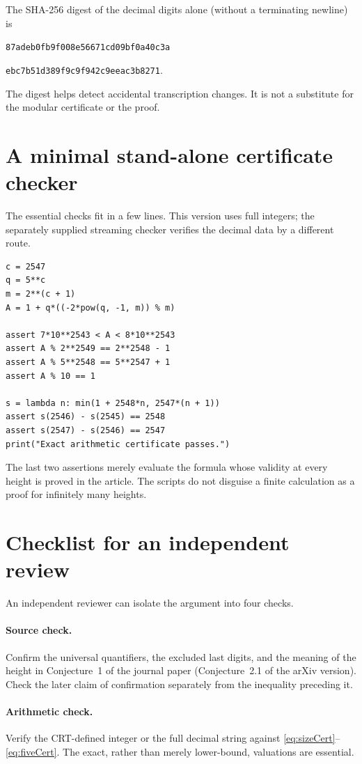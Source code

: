 \documentclass[11pt,a4paper]{article}
\theoremstyle{definition}
\theoremstyle{remark}
\begin{document}
\endgroup
The SHA-256 digest of the decimal digits alone (without a terminating newline) is
\begin{center}
\texttt{87adeb0fb9f008e56671cd09bf0a40c3a}\par
\texttt{ebc7b51d389f9c9f942c9eeac3b8271}.
\end{center}
The digest helps detect accidental transcription changes. It is not a substitute for the modular certificate or the proof.

\clearpage
\section{A minimal stand-alone certificate checker}
\label{app:minimal}
The essential checks fit in a few lines. This version uses full integers; the separately supplied streaming checker verifies the decimal data by a different route.
\begin{lstlisting}
c = 2547
q = 5**c
m = 2**(c + 1)
A = 1 + q*((-2*pow(q, -1, m)) % m)

assert 7*10**2543 < A < 8*10**2543
assert A % 2**2549 == 2**2548 - 1
assert A % 5**2548 == 5**2547 + 1
assert A % 10 == 1

s = lambda n: min(1 + 2548*n, 2547*(n + 1))
assert s(2546) - s(2545) == 2548
assert s(2547) - s(2546) == 2547
print("Exact arithmetic certificate passes.")
\end{lstlisting}
The last two assertions merely evaluate the formula whose validity at every height is proved in the article. The scripts do not disguise a finite calculation as a proof for infinitely many heights.

\section{Checklist for an independent review}
\label{app:checklist}
An independent reviewer can isolate the argument into four checks.

\paragraph{Source check.} Confirm the universal quantifiers, the excluded last digits, and the meaning of the height in Conjecture~1 of the journal paper (Conjecture~2.1 of the arXiv version). Check the later claim of confirmation separately from the inequality preceding it.

\paragraph{Arithmetic check.} Verify the CRT-defined integer or the full decimal string against \eqref{eq:sizeCert}--\eqref{eq:fiveCert}. The exact, rather than merely lower-bound, valuations are essential.
\end{document}
